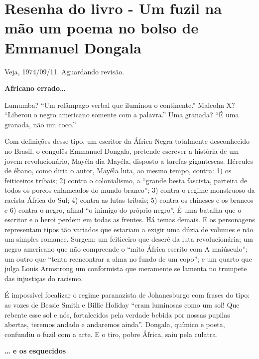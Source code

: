 \documentclass[
  letterpaper,
  DIV=11,
  numbers=noendperiod]{scrreprt}
\begin{document}
\chapter{Resenha do livro - Um fuzil na mão um poema no bolso de
Emmanuel
Dongala}\label{resenha-do-livro---um-fuzil-na-muxe3o-um-poema-no-bolso-de-emmanuel-dongala}

Veja, 1974/09/11. Aguardando revisão.

\hfill\break

\textbf{Africano errado\ldots{}}

Lumumba? ``Um relâmpago verbal que iluminou o continente.'' Malcolm X?
``Liberou o negro americano somente com a palavra.'' Uma granada? ``É
uma granada, não um coco.''

Com definições desse tipo, um escritor da África Negra totalmente
desconhecido no Brasil, o congolês Emmanuel Dongala, pretende escrever a
história de um jovem revolucionário, Mayéla dia Mayéla, disposto a
tarefas gigantescas. Hércules de ébano, como diria o autor, Mayéla luta,
ao mesmo tempo, contra: 1) os feiticeiros tribais; 2) contra o
colonialismo, a ``grande besta fascista, parteira de todos os porcos
enlameados do mundo branco''; 3) contra o regime monstruoso da racista
África do Sul; 4) contra as lutas tribais; 5) contra os chineses e os
brancos e 6) contra o negro, afinal ``o inimigo do próprio negro''. É
uma batalha que o escritor e o heroi perdem em todas as frentes. Há
temas demais. E os personagens representam tipos tão variados que
estariam a exigir uma dúzia de volumes e não um simples romance. Surgem:
um feiticeiro que descrê da luta revolucionária; um negro americano que
não compreende o ``mito África escrito com A maiúsculo''; um outro que
``tenta reencontrar a alma no fundo de um copo''; e um quarto que julga
Louis Armstrong um conformista que meramente se lamenta no trumpete das
injustiças do racismo.

É impossível focalizar o regime paranazista de Johanesburgo com frases
do tipo: as vozes de Bessie Smith e Billie Holiday ``eram luminosas como
um sol! Que rebente esse sol e nós, fortalecidos pela verdade bebida por
nossas pupilas abertas, teremos andado e andaremos ainda''. Dongala,
químico e poeta, confundiu o fuzil com a arte. E o tiro, pobre África,
saiu pela culatra.

\textbf{\ldots{} e os esquecidos}
\end{document}
